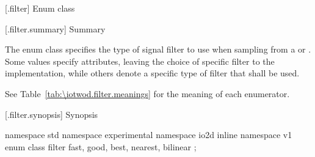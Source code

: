  [\iotwod.filter] {Enum class }

 [\iotwod.filter.summary] { Summary}

\pnum
The  enum class specifies the type of signal filter to use when 
sampling from a  or . Some values specify 
attributes, leaving the choice of specific filter to the implementation, while 
others denote a specific type of filter that shall be used.

\pnum
See Table~\ref{tab:\iotwod.filter.meanings} for the meaning of each
 enumerator.

 [\iotwod.filter.synopsis] { Synopsis}

\begin{codeblock}
namespace std { namespace experimental { namespace io2d { inline namespace v1 {
  enum class filter {
    fast,
    good,
    best,
    nearest,
    bilinear
  };
} } } }
\end{codeblock}


